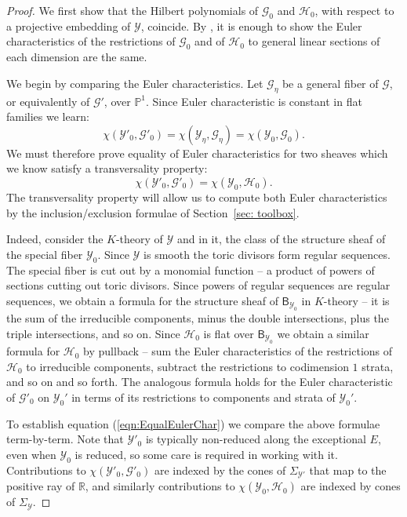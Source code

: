 \documentclass[11pt]{amsart}
\theoremstyle{definition}
\theoremstyle{definition}
\newcommand{\RR}{\mathbb{R}}
\newcommand{\cG}{\mathcal{G}}
\newcommand{\cY}{\mathcal{Y}}
\newcommand{\cal}{\mathcal}
\def\cY{{\cal Y}}
\begin{document}
\begin{proof}
We first show that the Hilbert polynomials of $\mathcal G_0$ and $\mathcal H_0$, with respect to a projective embedding of $\cY$, coincide. By \cite[Lemma 1.2.1]{GeometryModuliSheaves}, it is enough to show the Euler characteristics of the restrictions of $\cG_0$ and of $\mathcal H_0$ to general linear sections of each dimension are the same.

We begin by comparing the Euler characteristics. Let $\mathcal G_\eta$ be a general fiber of $\mathcal G$, or equivalently of $\mathcal G'$, over $\mathbb P^1$. Since Euler characteristic is constant in flat families we learn:%
\[
\chi(\cY'_0,\mathcal G'_0) = \chi(\cY_\eta,\cG_\eta) = \chi(\cY_0,\mathcal G_0).
\]
We must therefore prove equality of Euler characteristics for two sheaves which we know satisfy a transversality property: \begin{equation}\label{eqn:EqualEulerChar} \chi(\cY'_0,\mathcal G'_0) = \chi(\cY_0,\mathcal H_0).\end{equation} The transversality property will allow us to compute both Euler characteristics by the inclusion/exclusion formulae of Section~\ref{sec: toolbox}. 

Indeed, consider the $K$-theory of $\mathcal Y$ and in it, the class of the structure sheaf of the special fiber $\mathcal Y_0$. Since $\mathcal Y$ is smooth the toric divisors form regular sequences. The special fiber is cut out by a monomial function -- a product of powers of sections cutting out toric divisors. Since powers of regular sequences are regular sequences, we obtain a formula for the structure sheaf of $\mathsf B_{\cY_0}$ in $K$-theory -- it is the sum of the irreducible components, minus the double intersections, plus the triple intersections, and so on. Since $\mathcal H_0$ is flat over $\mathsf B_{\cY_0}$ we obtain a similar formula for $\mathcal H_0$ by pullback -- sum the Euler characteristics of the restrictions of $\mathcal H_0$ to irreducible components, subtract the restrictions to codimension $1$ strata, and so on and so forth. The analogous formula holds for the Euler characteristic of $\mathcal G'_0$ on $\cY_0'$ in terms of its restrictions to components and strata of $\cY_0'$. 

To establish equation (\ref{eqn:EqualEulerChar}) we compare the above formulae term-by-term. Note that $\cY'_0$ is typically non-reduced along the exceptional $E$, even when $\cY_0$ is reduced, so some care is required in working with it. Contributions to 
$\chi(\cY'_0,\mathcal G'_0)$ are indexed by the cones of $\Sigma_{\mathcal Y'}$ that map to the positive ray of $\RR$, and similarly contributions to $\chi(\cY_0,\mathcal H_0)$ are indexed by cones of $\Sigma_{\cY}$. 


\end{proof}
\end{document}
